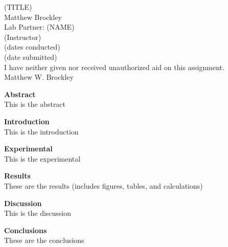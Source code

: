 \documentclass[12pt]{article}
\begin{document}
\begin{center}
(TITLE)\\
Matthew Brockley\\
Lab Partner: (NAME)\\
(Instructor)\\
(dates conducted)\\
(date submitted)\\
I have neither given nor received unauthorized aid on this assignment.\\
Matthew W. Brockley
\end{center}

\newpage
\begin{flushleft}
\textbf{Abstract}\\
\setlength{\parindent}{0.5in}
This is the abstract

\newpage
\noindent\textbf{Introduction}\\
This is the introduction

\newpage
\noindent\textbf{Experimental}\\
This is the experimental

\newpage
\noindent\textbf{Results}\\
These are the results (includes figures, tables, and calculations)

\newpage
\noindent\textbf{Discussion}\\
This is the discussion

\newpage
\noindent\textbf{Conclusions}\\
These are the conclusions


\end{flushleft}
\end{document}
